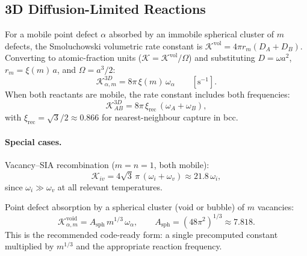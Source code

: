 \documentclass[pdflatex,sn-basic]{sn-jnl} %
\begin{document}
\subsection{3D Diffusion-Limited Reactions}
\label{sec:K3D}

For a mobile point defect $\alpha$ absorbed by an immobile spherical cluster
of $m$ defects, the Smoluchowski volumetric rate constant is
$\mathcal{K}^{\mathrm{vol}} = 4\pi r_m (D_A + D_B)$. Converting to
atomic-fraction units ($\mathcal{K} = \mathcal{K}^{\mathrm{vol}}/\Omega$) and
substituting $D = \omega a^2$, $r_m = \xi(m)\,a$, and $\Omega = a^3/2$:
\begin{equation}\label{eq:K3D}
    \mathcal{K}_{\alpha,m}^{3D} = 8\pi\,\xi(m)\,\omega_\alpha
    \qquad [\text{s}^{-1}].
\end{equation}
When both reactants are mobile, the rate constant includes both frequencies:
\begin{equation}\label{eq:K3D_both}
    \mathcal{K}_{AB}^{3D} = 8\pi\,\xi_{\mathrm{rec}}\,(\omega_A + \omega_B),
\end{equation}
with $\xi_{\mathrm{rec}} = \sqrt{3}/2 \approx 0.866$ for nearest-neighbour
capture in bcc.

\paragraph{Special cases.}

Vacancy--SIA recombination ($m=n=1$, both mobile):
\begin{equation}\label{eq:K_recomb}
    \mathcal{K}_{iv} = 4\sqrt{3}\,\pi\,(\omega_i + \omega_v)
    \approx 21.8\,\omega_i,
\end{equation}
since $\omega_i \gg \omega_v$ at all relevant temperatures.

Point defect absorption by a spherical cluster (void or bubble) of $m$
vacancies:
\begin{equation}\label{eq:K_void}
    \mathcal{K}_{\alpha,m}^{\mathrm{void}}
    = A_{\mathrm{sph}}\,m^{1/3}\,\omega_\alpha,
    \qquad A_{\mathrm{sph}} = (48\pi^2)^{1/3} \approx 7.818.
\end{equation}
This is the recommended code-ready form: a single precomputed constant
multiplied by $m^{1/3}$ and the appropriate reaction frequency.
\end{document}
